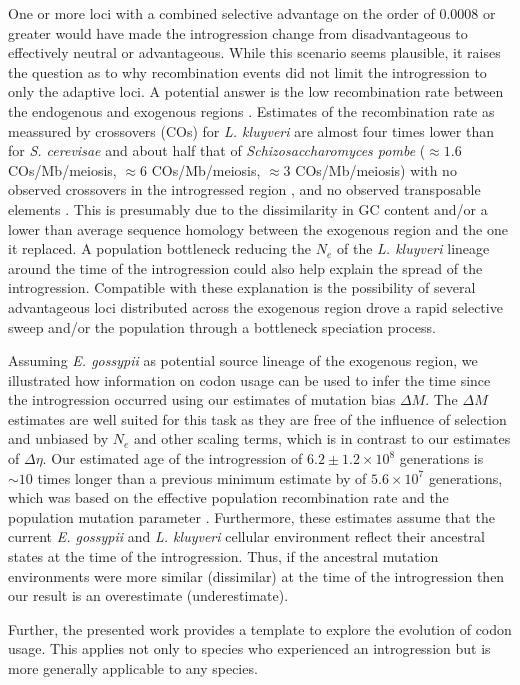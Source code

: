 \documentclass[doublespacing,linenumbers]{bmcart}
\newcommand{\kluyveri}{\textit{L. kluyveri}\xspace}
\newcommand{\gossypii}{\textit{E. gossypii}\xspace}
\newcommand{\GC}{GC content\xspace}
\newcommand{\DM}{\ensuremath{{\Delta M}}\xspace}
\newcommand{\DE}{\ensuremath{{\Delta \eta}}\xspace}
\newcommand{\Ne}{\ensuremath{N_e}\xspace}
\begin{document}
One or more loci with a combined selective advantage on the order of $0.0008$ or greater would have made the introgression change from disadvantageous to effectively neutral or advantageous.
While this scenario seems plausible, it raises the question as to why recombination events did not limit the introgression to only the adaptive loci.
A potential answer is the low recombination rate between the endogenous and exogenous regions \cite{payen2009, brion2017}.
Estimates of the recombination rate as meassured by crossovers (COs) for \kluyveri are almost four times lower than for \textit{S. cerevisae} and about half that of \textit{Schizosaccharomyces pombe} ($\approx1.6$ COs/Mb/meiosis, $\approx6$ COs/Mb/meiosis, $\approx3$ COs/Mb/meiosis) with no observed crossovers in the introgressed region \cite{brion2017}, and no observed transposable elements \cite{payen2009}.
This is presumably due to the dissimilarity in \GC and/or a lower than average sequence homology between the exogenous region and the one it replaced.
A population bottleneck reducing the \Ne of the \kluyveri lineage around the time of the introgression could also help explain the spread of the introgression.
Compatible with these explanation is the possibility of several advantageous loci distributed across the exogenous region drove a rapid selective sweep and/or the population through a bottleneck speciation process.

Assuming \gossypii as potential source lineage of the exogenous region, we illustrated how information on codon usage can be used to infer the time since the introgression occurred using our estimates of mutation bias \DM.
The \DM estimates are well suited for this task as they are free of the influence of selection and unbiased by $\Ne$ and other scaling terms, which is in contrast to our estimates of \DE \citep{gilchrist2015}.
Our estimated age of the introgression of $6.2\pm1.2\times 10^8$ generations is $\sim 10$ times longer than a previous minimum estimate by \cite{friedrich2015} of $5.6\times 10^7$ generations, which was based on the effective population recombination rate and the population mutation parameter \citep{Ruderfer2006}.
Furthermore, these estimates assume that the current \gossypii and \kluyveri cellular environment reflect their ancestral states at the time of the introgression.
Thus, if the ancestral mutation environments were more similar (dissimilar) at the time of the introgression then our result is an overestimate (underestimate).

Further, the presented work provides a template to explore the evolution of codon usage.
This applies not only to species who experienced an introgression but is more generally applicable to any species.
\end{document}
